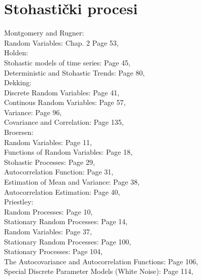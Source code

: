 \documentclass[a4paper,12pt,oneside]{memoir}
\begin{document}
        \section{Stohastički procesi} \label{stoh_proc}
            Montgomery and Rugner:\\
            Random Variables: Chap. 2 Page 53,\\

            Holden:\\
            Stohastic models of time series: Page 45,\\
            Deterministic and Stohastic Trends: Page 80,\\

            Dekking:\\
            Discrete Random Variables: Page 41,\\
            Continous Random Variables: Page 57,\\
            Variance: Page 96,\\
            Covariance and Correlation: Page 135,\\


            Broersen:\\
            Random Variables: Page 11,\\
            Functions of Random Variables: Page 18,\\
            Stohastic Processes: Page 29,\\
            Autocorrelation Function: Page 31,\\
            Estimation of Mean and Variance: Page 38,\\
            Autocorrelation Estimation: Page 40,\\

            Priestley:\\
            Random Processes: Page 10,\\
            Stationary Random Processes: Page 14,\\
            Random Variables: Page 37,\\
            Stationary Random Processes: Page 100,\\
            Stationary Processes: Page 104,\\
            The Autocovariance and Autocorrelation Functions: Page 106,\\
            Special Discrete Parameter Models (White Noise): Page 114,\\
\end{document}
